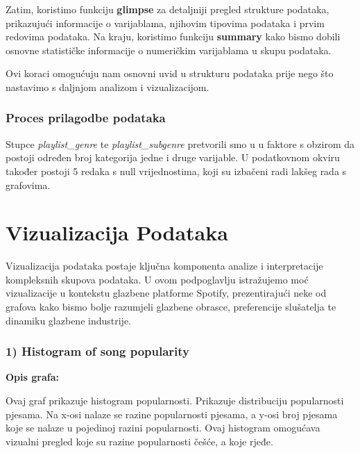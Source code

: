 		Zatim, koristimo funkciju \textbf{glimpse} za detaljniji pregled strukture podataka, prikazujući informacije o varijablama, njihovim tipovima podataka i prvim redovima podataka. Na kraju, koristimo funkciju \textbf{summary} kako bismo dobili osnovne statističke informacije o numeričkim varijablama u skupu podataka.
		
		Ovi koraci omogućuju nam osnovni uvid u strukturu podataka prije nego što nastavimo s daljnjom analizom i vizualizacijom.

	
	\subsubsection{Proces prilagodbe podataka}
	Stupce \textit{playlist\_genre} te \textit{playlist\_subgenre} pretvorili smo u u faktore s obzirom da postoji određen broj kategorija jedne i druge varijable. U podatkovnom okviru također postoji 5 redaka s null vrijednostima, koji su izbačeni radi lakšeg rada s grafovima.
	


\clearpage
\section{Vizualizacija Podataka}
	Vizualizacija podataka postaje ključna komponenta analize i interpretacije kompleksnih skupova podataka. 
	U ovom podpoglavlju istražujemo moć vizualizacije u kontekstu glazbene platforme Spotify, prezentirajući neke od grafova kako bismo bolje razumjeli glazbene obrasce, preferencije slušatelja te dinamiku glazbene industrije.
	
	\subsubsection{1) Histogram of song popularity}
	
	\textbf{Opis grafa:}
	
	Ovaj graf prikazuje histogram popularnosti. Prikazuje distribuciju popularnosti pjesama. Na x-osi nalaze se razine popularnosti pjesama, a y-osi broj pjesama koje se nalaze u pojedinoj razini popularnosti.
	Ovaj histogram omogućava vizualni pregled koje su razine popularnosti češće, a koje rjeđe. 

